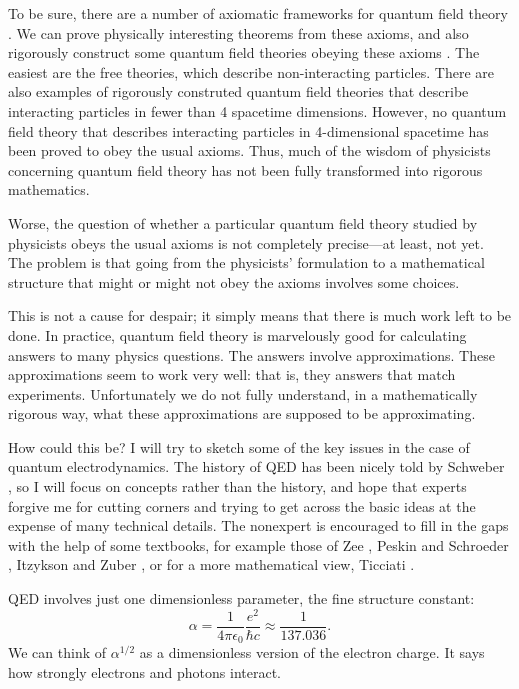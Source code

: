 \documentclass[12pt]{article}
\begin{document}
To be sure, there are a number of axiomatic frameworks for quantum field theory \cite{Haag,StreaterWightman}.  We can prove physically interesting theorems  from these axioms, and also rigorously construct some quantum field theories obeying these axioms \cite{BSZ,GlimmJaffe,Rivasseau}.  The easiest are the free theories,  which describe non-interacting particles.  There are also examples of rigorously  construted quantum field theories that describe interacting particles in fewer than 4 spacetime dimensions.  However, no quantum field theory that describes interacting particles in 4-dimensional spacetime has been proved to obey the usual axioms.   Thus, much of the wisdom of physicists concerning quantum field theory has not been fully transformed into rigorous mathematics.  

Worse, the question of whether a particular quantum field theory studied by physicists obeys the usual axioms is not completely precise---at least, not yet.  The problem is that going from the physicists' formulation to a mathematical structure that might or might not obey the axioms involves some choices.

This is not a cause for despair; it simply means that there is much work left to be done. In practice, quantum field theory is marvelously good for calculating answers to many physics questions.  The answers involve approximations.   These approximations seem to work very well: that is, they answers that match experiments.  Unfortunately we do not fully understand, in a mathematically rigorous way, what these approximations are supposed to be approximating.

How could this be?  I will try to sketch some of the key issues in the case of quantum electrodynamics.  The history of QED has been nicely told by Schweber \cite{Schweber}, so I will focus on concepts rather than the history, and hope that experts forgive me for cutting corners and trying to get across the basic ideas at the expense of many technical details.  The nonexpert is encouraged to fill in the gaps with the help of some textbooks, for example those of Zee \cite{Zee}, Peskin and Schroeder \cite{PS}, Itzykson and Zuber \cite{IZ}, or for a more mathematical view, Ticciati \cite{Ticciati}.

QED involves just one dimensionless parameter, the fine structure constant:
\[   \alpha = \frac{1}{4 \pi \epsilon_0} \frac{e^2}{\hbar c} \approx \frac{1}{137.036} .\]
We can think of $\alpha^{1/2}$ as a dimensionless version of the electron charge.  It  says how strongly electrons and photons interact.   
\end{document}
